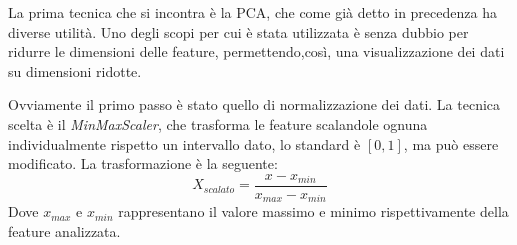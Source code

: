 La prima tecnica che si incontra è la PCA, che come già detto in precedenza ha diverse utilità. Uno degli scopi per cui è stata utilizzata è senza dubbio per ridurre le dimensioni delle feature, permettendo,così, una visualizzazione dei dati su dimensioni ridotte.

Ovviamente il primo passo è stato quello di normalizzazione dei dati. La tecnica scelta è il \textit{MinMaxScaler}, che trasforma le feature scalandole ognuna individualmente rispetto un intervallo dato, lo standard è $[0,1]$, ma può essere modificato.  La trasformazione è la seguente:
\begin{equation*}
	X_{scalato} = \frac{x-x_{min}}{x_{max} - x_{min}} 
\end{equation*}
Dove $x_{max}$ e $x_{min}$ rappresentano il valore massimo e minimo rispettivamente della feature analizzata.


